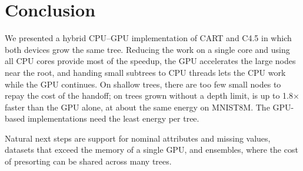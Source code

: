 \section{Conclusion}
\label{sec:conclusion}

We presented a hybrid CPU--GPU implementation of CART and C4.5 in which both devices grow the same tree. Reducing the work on a single core and using all CPU cores provide most of the speedup, the GPU accelerates the large nodes near the root, and handing small subtrees to CPU threads lets the CPU work while the GPU continues. On shallow trees, there are too few small nodes to repay the cost of the handoff; on trees grown without a depth limit, \ImplHybrid{} is up to 1.8$\times$ faster than the GPU alone, at about the same energy on MNIST8M. The GPU-based implementations need the least energy per tree.

Natural next steps are support for nominal attributes and missing values, datasets that exceed the memory of a single GPU, and ensembles, where the cost of presorting can be shared across many trees.
